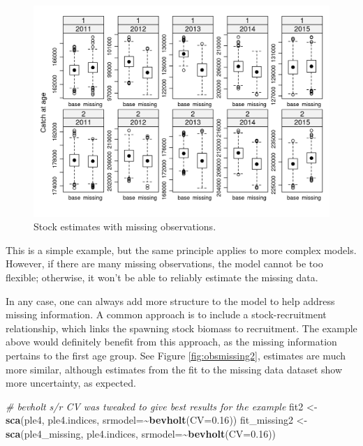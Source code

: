 \documentclass[
]{book}
\newenvironment{Shaded}{\begin{snugshade}}{\end{snugshade}}
\newcommand{\AttributeTok}[1]{\textcolor[rgb]{0.13,0.29,0.53}{#1}}
\newcommand{\CommentTok}[1]{\textcolor[rgb]{0.56,0.35,0.01}{\textit{#1}}}
\newcommand{\FloatTok}[1]{\textcolor[rgb]{0.00,0.00,0.81}{#1}}
\newcommand{\FunctionTok}[1]{\textcolor[rgb]{0.13,0.29,0.53}{\textbf{#1}}}
\newcommand{\NormalTok}[1]{#1}
\newcommand{\OtherTok}[1]{\textcolor[rgb]{0.56,0.35,0.01}{#1}}
\newcommand{\SpecialCharTok}[1]{\textcolor[rgb]{0.81,0.36,0.00}{\textbf{#1}}}
\begin{document}
\begin{figure}
\centering
\includegraphics{_bookdown_files/_main_files/figure-html/obsmissing-1.png}
\caption{\label{fig:obsmissing}Stock estimates with missing observations.}
\end{figure}

This is a simple example, but the same principle applies to more complex models. However, if there are many missing observations, the model cannot be too flexible; otherwise, it won't be able to reliably estimate the missing data.

In any case, one can always add more structure to the model to help address missing information. A common approach is to include a stock-recruitment relationship, which links the spawning stock biomass to recruitment. The example above would definitely benefit from this approach, as the missing information pertains to the first age group. See Figure \ref{fig:obsmissing2}, estimates are much more similar, although estimates from the fit to the missing data dataset show more uncertainty, as expected.

\begin{Shaded}
\begin{Highlighting}[]
\CommentTok{\# bevholt s/r CV was tweaked to give best results for the example}
\NormalTok{fit2 }\OtherTok{\textless{}{-}} \FunctionTok{sca}\NormalTok{(ple4, ple4.indices, }\AttributeTok{srmodel=}\SpecialCharTok{\textasciitilde{}}\FunctionTok{bevholt}\NormalTok{(}\AttributeTok{CV=}\FloatTok{0.16}\NormalTok{))}
\NormalTok{fit\_missing2 }\OtherTok{\textless{}{-}} \FunctionTok{sca}\NormalTok{(ple4\_missing, ple4.indices, }\AttributeTok{srmodel=}\SpecialCharTok{\textasciitilde{}}\FunctionTok{bevholt}\NormalTok{(}\AttributeTok{CV=}\FloatTok{0.16}\NormalTok{))}
\end{Highlighting}
\end{Shaded}
\end{document}
